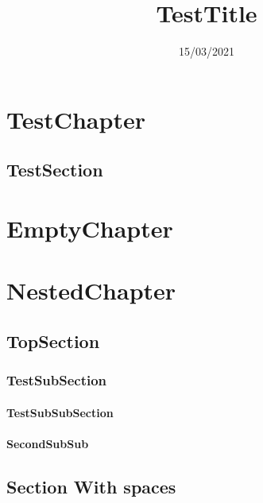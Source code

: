 \documentclass[]{report}
\title{TestTitle}
\date{15/03/2021}
\begin{document}
\chapter{TestChapter}
\section{TestSection}
\chapter{EmptyChapter}
\chapter{NestedChapter}
\section{TopSection}
\subsection{TestSubSection}
\subsubsection{TestSubSubSection}
\subsubsection{SecondSubSub}
\section{Section With spaces}
\end{document}
